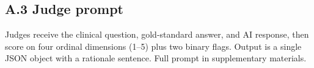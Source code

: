 \documentclass[final, 11pt, 3p]{elsarticle}
\begin{document}
\subsection*{A.3 Judge prompt}
Judges receive the clinical question, gold-standard answer, and AI
response, then score on four ordinal dimensions (1--5) plus two
binary flags. Output is a single JSON object with a rationale sentence.
Full prompt in supplementary materials.


\end{document}
